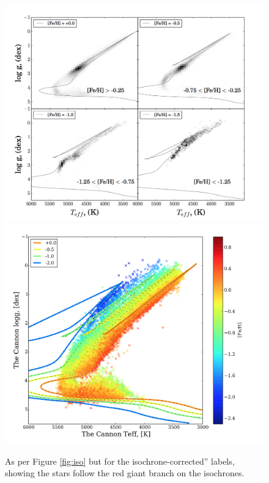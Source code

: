 \documentclass[12pt, preprint]{aastex}
\begin{document}
\begin{figure}[!h]
\centering

      \includegraphics[scale=0.25]{./plots/iso2.png}
  \hspace{-20pt}
    \includegraphics[scale=0.25]{./plots/iso2a.png}
\caption{As per Figure \ref{fig:iso} but for the isochrone-corrected'' labels, showing the stars follow the red giant branch on the isochrones.}
\label{fig:iso2}
\end{figure}
\end{document}
